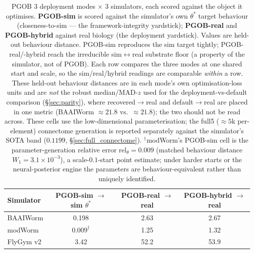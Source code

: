 \documentclass[11pt]{article}
\begin{document}
\begin{table}[H]
\centering\small
\caption{PGOB 3 deployment modes $\times$ 3 simulators, each scored against the object it optimises. \textbf{PGOB-sim} is scored against the simulator's own $\theta^{*}$ target behaviour (closeness-to-sim --- the framework-integrity yardstick); \textbf{PGOB-real} and \textbf{PGOB-hybrid} against real biology (the deployment yardstick). Values are held-out behaviour distance. PGOB-sim reproduces the sim target tightly; PGOB-real/-hybrid reach the irreducible sim$\leftrightarrow$real substrate floor (a property of the simulator, not of PGOB). Each row compares the three modes at one shared start and scale, so the sim/real/hybrid readings are comparable \emph{within} a row. These held-out behaviour distances are in each mode's own optimisation-loss units and are \emph{not} the robust median/MAD-$z$ used for the deployment-vs-default comparison (\S\ref{sec:parity}), where recovered$\to$real and default$\to$real are placed in one metric (BAAIWorm ${\approx}21.8$ vs.\ ${\approx}21.8$); the two should not be read across. These cells use the low-dimensional parameterisation; the full5 ($\approx5$k per-element) connectome generation is reported separately against the simulator's SOTA band ($0.1199$, \S\ref{sec:full_connectome}). $^{\dagger}$modWorm's PGOB-sim cell is the parameter-generation relative error $\mathrm{rel}_\theta{=}0.009$ (matched behaviour distance $W_1{=}3.1\times10^{-3}$), a scale-$0.1$-start point estimate; under harder starts or the neural-posterior engine the parameters are behaviour-equivalent rather than uniquely identified.}
\label{tab:modes_v8}
\begin{tabular}{lccc}\toprule
Simulator & PGOB-sim $\to$ sim $\theta^{*}$ & PGOB-real $\to$ real & PGOB-hybrid $\to$ real \\\midrule
BAAIWorm   & 0.198 & 2.63 & 2.67 \\
modWorm    & $0.009^{\dagger}$ & 1.25 & 1.32 \\
FlyGym v2  & 3.42  & 52.2 & 53.9 \\\bottomrule
\end{tabular}
\end{table}
\end{document}
